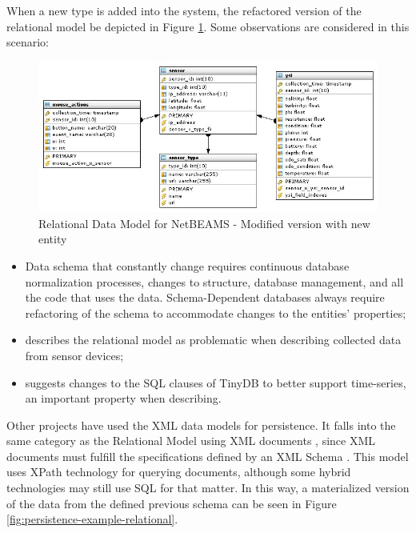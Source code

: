 When a new type is added into the system, the refactored version of the
relational model be depicted in Figure
\ref{fig:Relational-Model-Addition-Modified}. Some observations are considered
in this scenario:

\begin{figure}
  \centering
  \includegraphics[scale=0.5]{../diagrams/Relational-Model-Addition-Modified}
  \caption{Relational Data Model for NetBEAMS - Modified version with new
  entity}
  \label{fig:Relational-Model-Addition-Modified}
\end{figure}

\begin{itemize}
  \item Data schema that constantly change requires continuous database
  normalization processes, changes to structure, database management, and all
  the code that uses the data. Schema-Dependent databases always require
  refactoring of the schema to accommodate changes to the entities' properties;
  \item \cite{sn-provenance} describes the relational model as problematic 
  when describing collected data from sensor devices;
  \item \cite{sn-db-newop} suggests changes to the SQL clauses of TinyDB to
  better support time-series, an important property when describing.
\end{itemize}

Other projects have used the XML data models for persistence. It falls
into the same category as the Relational Model using XML documents \cite{xml},
since XML documents must fulfill the specifications defined by an XML Schema
\cite{xml-schema}. This model uses XPath \cite{xml-xpath} technology for
querying documents, although some hybrid \cite{db2} technologies may still use
SQL \cite{sql} for that matter. In this way, a materialized version of the
data from the defined previous schema can be seen in Figure
\ref{fig:persistence-example-relational}.

